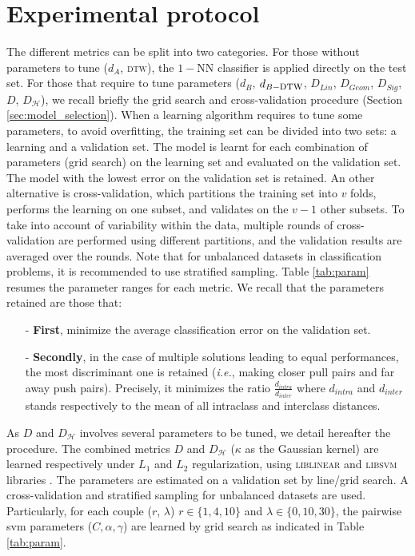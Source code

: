 \section{Experimental protocol}
The different metrics can be split into two categories. For those without parameters to tune ($d_A$, \textsc{dtw}), the $1-$NN classifier is applied directly on the test set. For those that require to tune parameters ($d_B$, $d_{B-\mbox{\sc dtw}}$, $D_{Lin}$, $D_{Geom}$, $D_{Sig}$, $D$, $D_{\mathcal{H}}$), we recall briefly the grid search and cross-validation procedure (Section \ref{sec:model_selection}). When a learning algorithm requires to tune some parameters, to avoid overfitting, the training set can be divided into two sets: a learning and a validation set. The model is learnt for each combination of parameters (grid search) on the learning set and evaluated on the validation set. The model with the lowest error on the validation set is retained. An other alternative is cross-validation, which partitions the training set into $v$ folds, performs the learning on one subset, and validates on the $v-1$ other subsets. To take into account of variability within the data, multiple rounds of cross-validation are performed using different partitions, and the validation results are averaged over the rounds. Note that for unbalanced datasets in classification problems, it is recommended to use stratified sampling. Table \ref{tab:param} resumes the parameter ranges for each metric. We recall that the parameters retained are those that:
\begin{itemize}
	\item[-] \textbf{First}, minimize the average classification error on the validation set.
	\item[-] \textbf{Secondly}, in the case of multiple solutions leading to equal performances, the most discriminant one is retained (\textit{i.e.}, making closer pull pairs and far away push pairs). Precisely, it minimizes the ratio $\frac{d_{intra}}{d_{inter}}$ where $d_{intra}$ and $d_{inter}$ stands respectively to the mean of all intraclass and interclass distances.
\end{itemize} 
\noindent As $D$ and $D_{\mathcal{H}}$ involves several parameters to be tuned, we detail hereafter the procedure. The combined metrics $D$ and $D_{\mathcal{H}}$  ($\kappa$ as the Gaussian kernel) are learned respectively under $L_1$ and $L_2$ regularization, using \textsc{liblinear}  and \textsc{libsvm} libraries \cite{Fan2008,Hsu2008}. The parameters are estimated on a validation set by line/grid search. A cross-validation and stratified sampling for unbalanced datasets are used.  Particularly, for each  couple ($r$, $\lambda$) $r \in \{1, 4, 10\}$ and $\lambda \in \{0, 10, 30\}$, the pairwise {\sc svm} parameters ($C,\alpha, \gamma$) are learned by grid search as indicated in Table \ref{tab:param}. 

